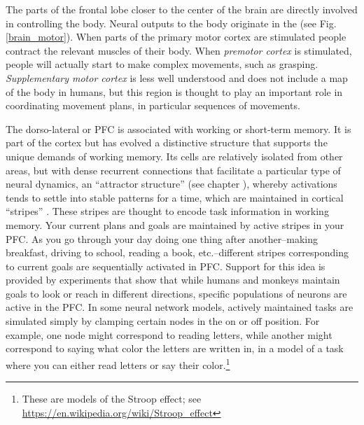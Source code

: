 The parts of the frontal lobe closer to the center of the brain are directly involved in controlling the body. Neural outputs to the body originate in the  (see Fig. \ref{brain_motor}). When parts of the primary motor cortex are stimulated people contract the relevant muscles of their body. When \emph{premotor cortex} is stimulated, people will actually start to make complex movements, such as grasping. \emph{Supplementary motor cortex} is less well understood and does not include a map of the body in humans, but this region is thought to play an important role in coordinating movement plans, in particular sequences of movements.

The dorso-lateral  or PFC is associated with working or short-term memory. It is part of the cortex but has evolved a distinctive structure that supports the unique demands of working memory. Its cells are relatively isolated from other areas, but with dense recurrent connections that facilitate a particular type of neural dynamics, an ``attractor structure'' (see chapter ), whereby activations tends to settle into stable patterns for a time, which are maintained in cortical ``stripes'' \cite{kriete2013indirection}. These stripes are thought to encode task information in working memory. Your current plans and goals are maintained by active stripes in your PFC. As you go through your day doing one thing after another--making breakfast, driving to school, reading a book, etc.--different stripes corresponding to current goals are sequentially activated in PFC. Support for this idea is provided by experiments that show that while humans and monkeys maintain goals to look or reach in different directions, specific populations of neurons are active in the PFC. In some neural network models, actively maintained tasks are simulated simply by clamping certain nodes in the on or off position. For example, one node might correspond to reading letters, while another might correspond to saying what color the letters are written in, in a model of a task where you can either read letters or say their color.\footnote{These are models of the Stroop effect; see \url{https://en.wikipedia.org/wiki/Stroop_effect}}


